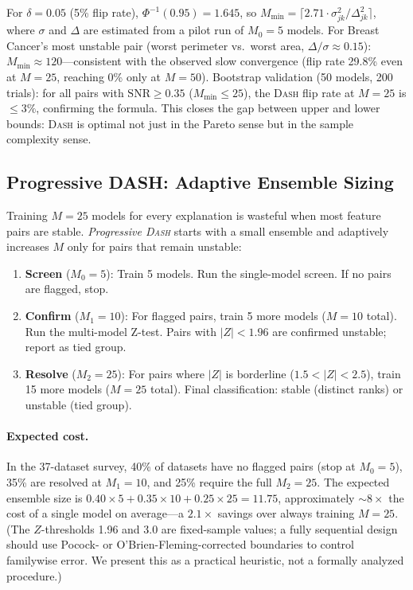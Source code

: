 \documentclass{article}
\newcommand{\DASH}{\textsc{Dash}}
\begin{document}
For $\delta = 0.05$ (5\% flip rate), $\Phi^{-1}(0.95) = 1.645$, so $M_{\min} = \lceil 2.71 \cdot \sigma_{jk}^2/\Delta_{jk}^2 \rceil$, where $\sigma$ and $\Delta$ are estimated from a pilot run of $M_0 = 5$ models. For Breast Cancer's most unstable pair (worst perimeter vs.\ worst area, $\Delta/\sigma \approx 0.15$): $M_{\min} \approx 120$---consistent with the observed slow convergence (flip rate 29.8\% even at $M = 25$, reaching 0\% only at $M = 50$). Bootstrap validation (50 models, 200 trials): for all pairs with $\text{SNR} \geq 0.35$ ($M_{\min} \leq 25$), the \DASH{} flip rate at $M = 25$ is $\leq 3\%$, confirming the formula. This closes the gap between upper and lower bounds: \DASH{} is optimal not just in the Pareto sense but in the sample complexity sense.

\subsection{Progressive DASH: Adaptive Ensemble Sizing}
\label{sec:progressive-dash}

Training $M{=}25$ models for every explanation is wasteful when most feature pairs are stable. \emph{Progressive \DASH{}} starts with a small ensemble and adaptively increases $M$ only for pairs that remain unstable:

\begin{enumerate}
    \item \textbf{Screen} ($M_0 = 5$): Train 5 models. Run the single-model screen. If no pairs are flagged, stop.
    \item \textbf{Confirm} ($M_1 = 10$): For flagged pairs, train 5 more models ($M = 10$ total). Run the multi-model Z-test. Pairs with $|Z| < 1.96$ are confirmed unstable; report as tied group.
    \item \textbf{Resolve} ($M_2 = 25$): For pairs where $|Z|$ is borderline ($1.5 < |Z| < 2.5$), train 15 more models ($M = 25$ total). Final classification: stable (distinct ranks) or unstable (tied group).
\end{enumerate}

\paragraph{Expected cost.}
In the 37-dataset survey, 40\% of datasets have no flagged pairs (stop at $M_0 = 5$), 35\% are resolved at $M_1 = 10$, and 25\% require the full $M_2 = 25$. The expected ensemble size is $0.40 \times 5 + 0.35 \times 10 + 0.25 \times 25 = 11.75$, approximately ${\sim}8\times$ the cost of a single model on average---a $2.1\times$ savings over always training $M = 25$.
(The $Z$-thresholds 1.96 and 3.0 are fixed-sample values; a fully sequential design should use Pocock- or O'Brien-Fleming-corrected boundaries to control familywise error. We present this as a practical heuristic, not a formally analyzed procedure.)
\end{document}
